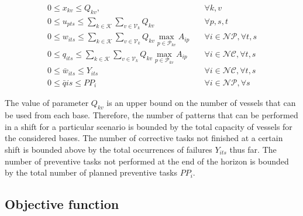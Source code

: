 \begin{align}
\label{eq:bound1}
  0 \leq x_{kv} \leq Q_{kv},				&\quad	\forall k,v\\
\label{eq:bound2}
  0 \leq u_{pts} \leq \sum\limits_{k\in\mathcal{K}} \sum\limits_{v\in\mathcal{V}_k} Q_{kv} &\quad \forall p,s,t  \\
\label{eq:bound3}
0 \leq w_{its} \leq \sum\limits_{k\in\mathcal{K}} \sum\limits_{v\in\mathcal{V}_k} Q_{kv}\max\limits_{p\in \mathcal{P}_{kv}}A_{ip} 	&\quad \forall i \in \mathcal{NP}, \forall t,s\\
\label{eq:bound4}  	
0 \leq q_{its} \leq \sum\limits_{k\in\mathcal{K}} \sum\limits_{v\in\mathcal{V}_k} Q_{kv}\max\limits_{p\in \mathcal{P}_{kv}}A_{ip} 	&\quad \forall i \in \mathcal{NC}, \forall t,s\\
\label{eq:bound5}
  0 \leq \bar{w}_{its}\leq Y_{i ts} &\quad	\forall i\in\mathcal{NC}, \forall t,s\\
\label{eq:bound6}
   0 \leq \bar{q}{is}\leq PP_{i} &\quad	\forall i\in\mathcal{NP}, \forall s
\end{align}



The value of parameter $Q_{kv}$ is an upper bound on the number of vessels that can be used from each base. Therefore, the number of patterns that can be performed in a shift for a particular scenario is bounded by the total capacity of vessels for the considered bases. The number of corrective tasks not finished at a certain shift is bounded above by the total occurrences of failures $Y_{its}$ thus far.
The number of preventive tasks not performed at the end of the horizon is bounded by the total number of planned preventive tasks $PP_i$.


\subsection{Objective function}

